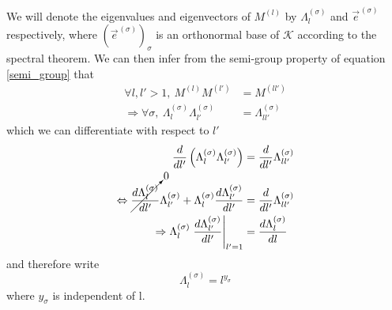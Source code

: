 \documentclass[class=report, float=false, crop=false]{standalone}
\begin{document}
We will denote the eigenvalues and eigenvectors of $M^{(l)}$ by $\Lambda^{(\sigma)}_l$ and $\vec{e}^{\hspace{1pt}(\sigma)}$ respectively, where $(\vec{e}^{\hspace{1pt}(\sigma)})_{\sigma}$ is an orthonormal base of $\mathcal{K}$ according to the spectral theorem. We can then infer from the semi-group property of equation \ref{semi_group} that
\begin{align*}
\forall l,l' >1,~ M^{(l)}M^{(l')} &= M^{(ll')}\\
\Rightarrow \forall \sigma,~ \Lambda^{(\sigma)}_l\Lambda^{(\sigma)}_{l'} &= \Lambda^{(\sigma)}_{ll'}
\end{align*}
which we can differentiate with respect to $l'$
\begin{align*}
\frac{d}{dl'}\left(\Lambda^{(\sigma)}_l\Lambda^{(\sigma)}_{l'}\right) &= \frac{d}{dl'}\Lambda^{(\sigma)}_{ll'}\\
\Leftrightarrow \cancelto{0}{\frac{d\Lambda^{(\sigma)}_l}{dl'}}\Lambda^{(\sigma)}_{l'} + \Lambda^{(\sigma)}_l\frac{d\Lambda^{(\sigma)}_{l'}}{dl'} &= \frac{d}{dl'} \Lambda^{(\sigma)}_{ll'}\\
\Rightarrow \Lambda^{(\sigma)}_l\left.\frac{d\Lambda^{(\sigma)}_{l'}}{dl'}\right|_{l'=1} &= \frac{d\Lambda^{(\sigma)}_l}{dl}
\end{align*}
and therefore write
\begin{equation}
\Lambda^{(\sigma)}_l = l^{y_{\sigma}}
\label{eigenvalues_scaling}
\end{equation}
where $y_{\sigma}$ is independent of l.\\
\end{document}

